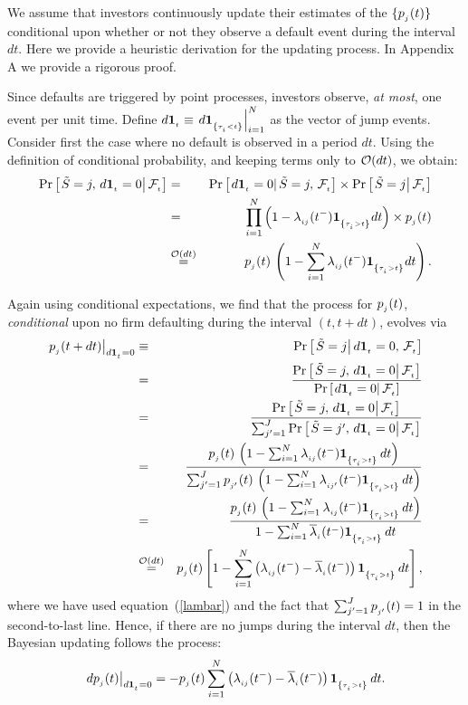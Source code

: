 \documentclass[titlepage,11pt]{article}
\def\bq{\begin{equation}}
\def\eq{\end{equation}}
\def\by{\begin{eqnarray}}
\def\ey{\end{eqnarray}}
\def\dq{d{\bf 1}}
\begin{document}
We assume that investors continuously update their estimates of the
$\{p_{_{{j}}}(t)\}$ conditional upon whether or not they observe a
default event during the interval $dt$. Here we provide a heuristic
derivation for the updating process.  In Appendix A we provide a
rigorous proof.

Since defaults are triggered by point processes, investors observe,
{\em at most}, one event per unit time.  Define $d{\bf 1}_{_{{t}}}
\equiv \left. d{\bf 1}_{_{{\left\{{\tau_{_{{i}}} < t}\right\}}}}\right|_{i=1}^{N}$ as the vector
of jump events. Consider first the case where no default is observed
in a period $dt$. Using the definition of conditional probability,
and keeping terms only to ${\cal O}(dt)$, we obtain: \by \Pr \left[
\left. \tilde{S} = j, \, \dq\sub{t}=0 \right| \F\sub{t} \right] &=&
\Pr \left[ \left.  \dq\sub{t}=0 \right| \tilde{S} = j, \, \F\sub{t}
\right] \times \Pr \left[ \left.  \tilde{S} = j \right| \F\sub{t}
\right]
\nonumber \\
%
&=& \prod_{i=1}^{N} \left( 1 - \lambda\sub{ij}(t^{-}) \ind{\ti>t}dt
\right) \times
p\sub{j}(t)  \nonumber \\
%
&\stackrel{{\cal O}(dt)}{=}& p\sub{j}(t) \, \left( 1-\sum_{i=1}^{N}
\lambda\sub{ij}(t^{-}) \ind{\ti>t}dt \right). \ey

Again using conditional expectations, we find that the process for
$p_{_{{j}}}(t)$, {\em conditional} upon no firm defaulting during the
interval $(t, t + dt)$, evolves via \by \left.
p\sub{j}(t+dt)\right|_{\dq\sub{t} = 0} &\equiv& \Pr \left[ \left.
\tilde{S} = j \right|  \dq\sub{t}=0, \, \F\sub{t} \right]
\nonumber \\
%
&=& \frac{\Pr \left[ \left. \tilde{S} = j, \, \dq\sub{t}=0 \right|
\F\sub{t} \right]}
{\Pr \left[ \left. \dq\sub{t}=0 \right| \F\sub{t} \right]} \nonumber \\
%
&=& \frac{\Pr \left[ \left. \tilde{S} = j, \, \dq\sub{t}=0 \right|
\F\sub{t} \right]} {\sum_{j'=1}^{J} \Pr \left[ \left. \tilde{S} =
j', \, \dq\sub{t}=0 \right|
\F\sub{t} \right]} \nonumber \\
%
&=& \frac{p\sub{j}(t) \, \left( 1-\sum_{i=1}^{N}
\lambda\sub{ij}(t^{-}) \ind{\ti>t}\,dt \right)} {\sum_{j'=1}^{J}
p\sub{j'}(t) \, \left( 1-\sum_{i=1}^{N} \lambda\sub{ij'}(t^{-})
\ind{\ti>t}\,dt \right)} \nonumber \\
%
&=& \frac{p\sub{j}(t) \, \left( 1-\sum_{i=1}^{N}
\lambda\sub{ij}(t^{-}) \ind{\ti>t}\,dt \right)}
{1-\sum_{i=1}^{N} \overline{\lambda}\sub{i}(t^{-}) \ind{\ti>t}\,dt} \nonumber \\
%
&\stackrel{{\cal O}(dt)}{=}& p\sub{j}(t) \left[ 1 - \sum_{i=1}^{N}
\left( \lambda\sub{ij}(t^{-}) - \overline{\lambda}\sub{i}(t^{-})
\right) \ind{\ti>t} \, dt \right], \ey where we have used
equation~(\ref{lambar}) and the fact that $\sum_{j'=1}^{J}
p_{_{{j'}}}(t) = 1$ in the second-to-last line.  Hence, if there are
no jumps during the interval $dt$, then the Bayesian updating
follows the process: \bq\label{nodef} \left.
dp\sub{j}(t)\right|_{\dq\sub{t} = 0} = - p\sub{j}(t) \sum_{i=1}^{N}
\left( \lambda\sub{ij}(t^{-}) - \overline{\lambda}\sub{i}(t^{-})
\right) \ind{\ti>t}\,dt. \eq
\end{document}

